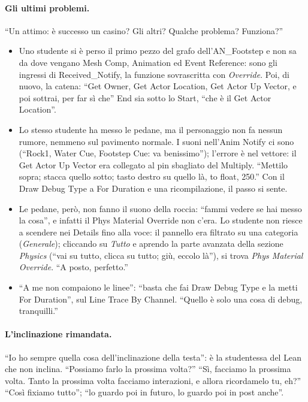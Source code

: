 \paragraph{Gli ultimi problemi.} ``Un attimo: è successo un casino? Gli altri? Qualche
problema? Funziona?''
\begin{itemize}
  \item Uno studente si è perso il primo pezzo del grafo dell'AN\_Footstep e non sa da
        dove vengano Mesh Comp, Animation ed Event Reference: sono gli ingressi di
        Received\_Notify, la funzione sovrascritta con \emph{Override}. Poi, di nuovo, la
        catena: ``Get Owner, Get Actor Location, Get Actor Up Vector, e poi sottrai,
        per far sì che'' End sia sotto lo Start, ``che è il Get Actor Location''.
  \item Lo stesso studente ha messo le pedane, ma il personaggio non fa nessun rumore,
        nemmeno sul pavimento normale. I suoni nell'Anim Notify ci sono (``Rock1, Water
        Cue, Footstep Cue: va benissimo''); l'errore è nel vettore: il Get Actor Up Vector
        era collegato al pin sbagliato del Multiply. ``Mettilo sopra; stacca quello
        sotto; tasto destro su quello là, to float, 250.'' Con il Draw Debug Type a For
        Duration e una ricompilazione, il passo si sente.
  \item Le pedane, però, non fanno il suono della roccia: ``fammi vedere se hai messo la
        cosa'', e infatti il Phys Material Override non c'era. Lo studente non riesce a
        scendere nei Details fino alla voce: il pannello era filtrato su una categoria
        (\emph{Generale}); cliccando su \emph{Tutto} e aprendo la parte avanzata della
        sezione \emph{Physics} (``vai su tutto, clicca su tutto; giù, eccolo là''), si
        trova \emph{Phys Material Override}. ``A posto, perfetto.''
  \item ``A me non compaiono le linee'': ``basta che fai Draw Debug Type e la metti For
        Duration'', sul Line Trace By Channel. ``Quello è solo una cosa di debug,
        tranquilli.''
\end{itemize}

\paragraph{L'inclinazione rimandata.} ``Io ho sempre quella cosa dell'inclinazione della
testa'': è la studentessa del Lean che non inclina. ``Possiamo farlo la prossima volta?''
``Sì, facciamo la prossima volta. Tanto la prossima volta facciamo interazioni, e allora
ricordamelo tu, eh?'' ``Così fixiamo tutto''; ``lo guardo poi in futuro, lo guardo poi in
post anche''.

